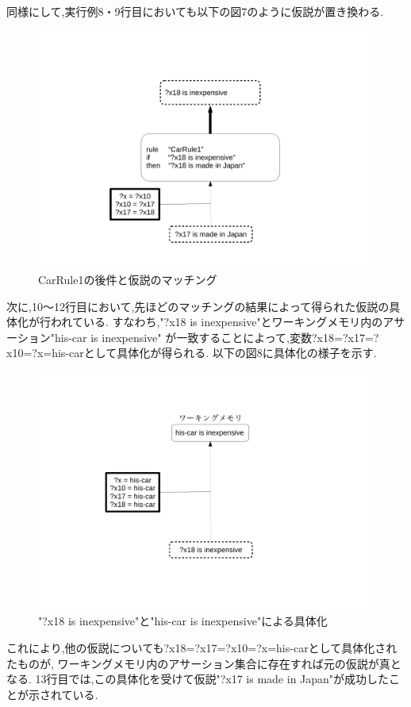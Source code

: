 \documentclass[uplatex,12pt]{jsarticle}
\begin{document}
同様にして,実行例8・9行目においても以下の図7のように仮説が置き換わる.
\begin{figure}[!hbt]
    \centering
    \includegraphics[scale=0.30]{images/backward_chaining_3.pdf}
    \caption{CarRule1の後件と仮説のマッチング}
\end{figure}

次に,10〜12行目において,先ほどのマッチングの結果によって得られた仮説の具体化が行われている.
すなわち,"?x18 is inexpensive"とワーキングメモリ内のアサーション"his-car is inexpensive"
が一致することによって,変数?x18=?x17=?x10=?x=his-carとして具体化が得られる.
以下の図8に具体化の様子を示す.
\begin{figure}[!hbt]
    \centering
    \includegraphics[scale=0.30]{images/backward_chaining_4.pdf}
    \caption{"?x18 is inexpensive"と"his-car is inexpensive"による具体化}
\end{figure}
これにより,他の仮説についても?x18=?x17=?x10=?x=his-carとして具体化されたものが,
ワーキングメモリ内のアサーション集合に存在すれば元の仮説が真となる.
13行目では,この具体化を受けて仮説"?x17 is made in Japan"が成功したことが示されている. \\
\end{document}
